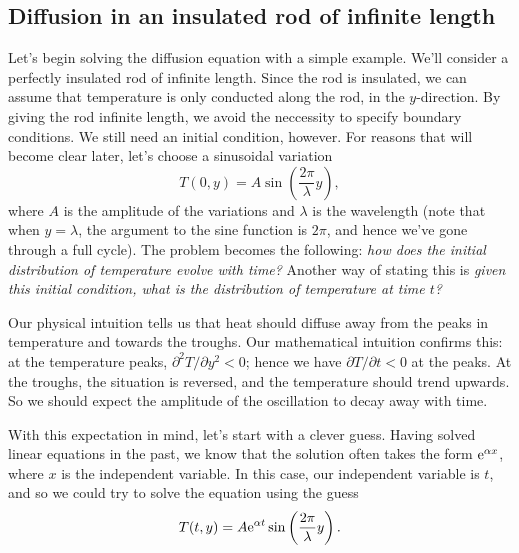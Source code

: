 \documentclass[11pt,twoside,a4paper]{article}
\begin{document}
\subsection{Diffusion in an insulated rod of infinite length}

Let's begin solving the diffusion equation with a simple example.
We'll consider a perfectly insulated rod of infinite length.  Since
the rod is insulated, we can assume that temperature is only conducted
along the rod, in the $y$-direction. By giving the rod infinite
length, we avoid the neccessity to specify boundary conditions.  We
still need an initial condition, however.  For reasons that will
become clear later, let's choose a sinusoidal variation
\begin{equation}
  \label{eq:IC}
  T(0,y) = A\sin\left(\frac{2\pi}{\lambda}y\right),
\end{equation}
where $A$ is the amplitude of the variations and $\lambda$ is the
wavelength (note that when $y=\lambda$, the argument to the sine
function is $2\pi$, and hence we've gone through a full cycle). The
problem becomes the following: \textit{how does the initial
  distribution of temperature evolve with time?}  Another way of
stating this is \textit{given this initial condition, what is the
  distribution of temperature at time $t$?}

Our physical intuition tells us that heat should diffuse away from the
peaks in temperature and towards the troughs.  Our mathematical
intuition confirms this: at the temperature peaks,
$\partial^2 T/\partial y^2 < 0$; hence we have
$\partial T/\partial t < 0$ at the peaks.  At the troughs, the
situation is reversed, and the temperature should trend upwards.  So
we should expect the amplitude of the oscillation to decay away with
time.

With this expectation in mind, let's start with a clever guess.
Having solved linear equations in the past, we know that the solution
often takes the form $\textrm{e}^{\alpha x}$, where $x$ is the independent
variable.  In this case, our independent variable is $t$, and so we
could try to solve the equation using the guess
\begin{equation}
  \label{eq:ansatz}
  T(t,y) = A\textrm{e}^{\alpha t}\sin\left(\frac{2\pi}{\lambda}y\right).
\end{equation}
\end{document}
